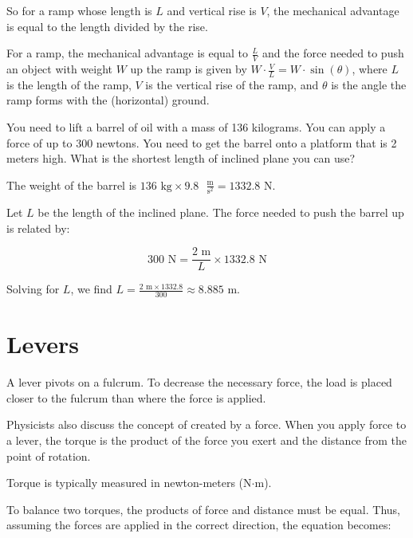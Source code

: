 So for a ramp whose length is $L$ and vertical rise is $V$, the mechanical 
advantage is equal to the length divided by the rise. 

\begin{mdframed}[style = important, frametitle={Ramps}]
For a ramp, the mechanical advantage is equal to $\frac{L}{V}$ and the force 
needed to push an object with weight $W$ up the ramp is given by $W \cdot 
\frac{V}{L} = W \cdot \sin{ \left( \theta \right)}$, where $L$ is the length 
of the ramp, $V$ is the vertical rise of the ramp, and $\theta$ is the angle 
the ramp forms with the (horizontal) ground.
\end{mdframed}

\begin{Exercise}[title={Ramp}, label=ramp]
You need to lift a barrel of oil with a mass of 136 kilograms. You can apply a 
force of up to 300 newtons. You need to get the barrel onto a platform that is 
2 meters high. What is the shortest length of inclined plane you can use?
\end{Exercise}
\begin{Answer}[ref=ramp]
The weight of the barrel is \( 136 \text{ kg} \times 9.8 \text{ } 
\frac{\text{m}}{\text{s}^2}= 1332.8 \text{ N}\).

Let \( L \) be the length of the inclined plane. The force needed to push the 
barrel up is related by:

\[
300 \text{ N}= \frac{2 \text{ m}}{L} \times 1332.8 \text{ N}
\]

Solving for \( L \), we find \( L = \frac{2 \text{ m} \times 1332.8}{300} 
\approx 8.885 \text{ m}\).
\end{Answer}

\section{Levers}

A lever pivots on a fulcrum. To decrease the necessary force, the load is placed 
closer to the fulcrum than where the force is applied.

Physicists also discuss the concept of  created by a force. When 
you apply force to a lever, the torque is the product of the force you exert and 
the distance from the point of rotation.

Torque is typically measured in newton-meters (N$\cdot$m).

To balance two torques, the products of force and distance must be equal. Thus, 
assuming the forces are applied in the correct direction, the equation becomes:

